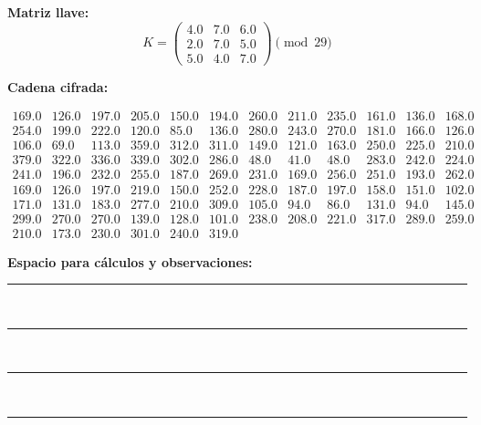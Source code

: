 \documentclass{article}%
\begin{document}
\textbf{Matriz llave:}
\[
K = \begin{pmatrix}
4.0 & 7.0 & 6.0 \\
2.0 & 7.0 & 5.0 \\
5.0 & 4.0 & 7.0
\end{pmatrix} \pmod{29}
\]

\textbf{Cadena cifrada:}
\begin{center}
$\begin{array}{lllllllllllllll}
169.0 & 126.0 & 197.0 & 205.0 & 150.0 & 194.0 & 260.0 & 211.0 & 235.0 & 161.0 & 136.0 & 168.0 \\
254.0 & 199.0 & 222.0 & 120.0 & 85.0 & 136.0 & 280.0 & 243.0 & 270.0 & 181.0 & 166.0 & 126.0 \\
106.0 & 69.0 & 113.0 & 359.0 & 312.0 & 311.0 & 149.0 & 121.0 & 163.0 & 250.0 & 225.0 & 210.0 \\
379.0 & 322.0 & 336.0 & 339.0 & 302.0 & 286.0 & 48.0 & 41.0 & 48.0 & 283.0 & 242.0 & 224.0 \\
241.0 & 196.0 & 232.0 & 255.0 & 187.0 & 269.0 & 231.0 & 169.0 & 256.0 & 251.0 & 193.0 & 262.0 \\
169.0 & 126.0 & 197.0 & 219.0 & 150.0 & 252.0 & 228.0 & 187.0 & 197.0 & 158.0 & 151.0 & 102.0 \\
171.0 & 131.0 & 183.0 & 277.0 & 210.0 & 309.0 & 105.0 & 94.0 & 86.0 & 131.0 & 94.0 & 145.0 \\
299.0 & 270.0 & 270.0 & 139.0 & 128.0 & 101.0 & 238.0 & 208.0 & 221.0 & 317.0 & 289.0 & 259.0 \\
210.0 & 173.0 & 230.0 & 301.0 & 240.0 & 319.0
\end{array}$
\end{center}

\bigskip
\textbf{Espacio para cálculos y observaciones:}\\[6pt]
\rule{\linewidth}{0.4pt}\\[10pt]
\rule{\linewidth}{0.4pt}\\[10pt]
\rule{\linewidth}{0.4pt}\\[10pt]
\rule{\linewidth}{0.4pt}\\[10pt]
%
\end{document}
